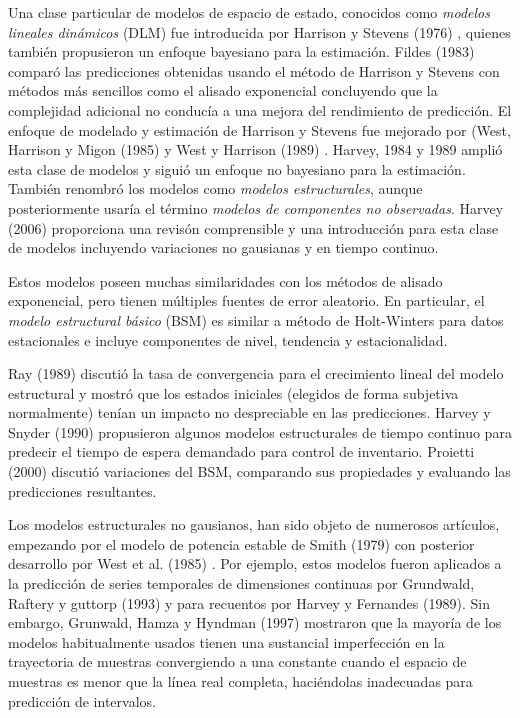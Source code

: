 \documentclass{llncs}
\begin{document}
Una clase particular de modelos de espacio de estado, conocidos como \emph{modelos lineales dinámicos} (DLM) fue introducida por Harrison y Stevens (1976) \cite{Harrison1976205}, quienes también propusieron un enfoque bayesiano para la estimación. Fildes (1983) \cite{Fildes1983137} comparó las predicciones obtenidas usando el método de Harrison y Stevens con métodos más sencillos como el alisado exponencial concluyendo que la complejidad adicional no conducía a una mejora del rendimiento de predicción. El enfoque de modelado y estimación de Harrison y Stevens fue mejorado por (West, Harrison y Migon (1985) \cite{West198573} y West y Harrison (1989) \cite{West1997}. Harvey, 1984 \cite{Harvey1984245} y 1989 \cite{Harvey1989} amplió esta clase de modelos y siguió un enfoque no bayesiano para la estimación. También renombró los modelos como \emph{modelos estructurales}, aunque posteriormente usaría el término \emph{modelos de componentes no observadas}. Harvey (2006) \cite{Harvey2006327} proporciona una revisón comprensible y una introducción para esta clase de modelos incluyendo variaciones no gausianas y en tiempo continuo. 

Estos modelos poseen muchas similaridades con los métodos de alisado exponencial, pero tienen múltiples fuentes de error aleatorio. En particular, el \emph{modelo estructural básico} (BSM) es similar a método de Holt-Winters para datos estacionales e incluye componentes de nivel, tendencia y estacionalidad.

Ray (1989) \cite{Ray1989537} discutió la tasa de convergencia para el crecimiento lineal del modelo estructural y mostró que los estados iniciales (elegidos de forma subjetiva normalmente) tenían un impacto no despreciable en las predicciones. Harvey y Snyder (1990) \cite{Harvey1990187} propusieron algunos modelos estructurales de tiempo continuo para predecir el tiempo de espera demandado para control de inventario. Proietti (2000)\cite{Proietti2000247} discutió variaciones del BSM, comparando sus propiedades y evaluando las predicciones resultantes.

Los modelos estructurales no gausianos, han sido objeto de numerosos artículos, empezando por el modelo de potencia estable de Smith (1979) \cite{Smith1979375} con posterior desarrollo por West et al. (1985) \cite{West198573}. Por ejemplo, estos modelos fueron aplicados a la predicción de series temporales de dimensiones continuas por Grundwald, Raftery y guttorp (1993) \cite{Grunwald1993103} y para recuentos por Harvey y Fernandes (1989)\cite{Harvey1989407}. Sin embargo, Grunwald, Hamza y Hyndman (1997)\cite{Grunwald1997615} mostraron que la mayoría de los modelos habitualmente usados tienen una sustancial imperfección en la trayectoria de muestras convergiendo a una constante cuando el espacio de muestras es menor que la línea real completa, haciéndolas inadecuadas para predicción de intervalos.
\end{document}
